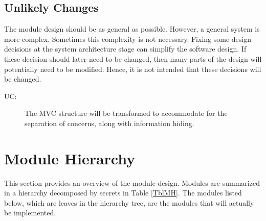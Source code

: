 \documentclass[12pt, titlepage]{article}
\newcounter{ucnum}
\newcommand{\uctheucnum}{UC\theucnum}
\begin{document}
\subsection{Unlikely Changes} \label{SecUchange}

The module design should be as general as possible. However, a general system is
more complex. Sometimes this complexity is not necessary. Fixing some design
decisions at the system architecture stage can simplify the software design. If
these decision should later need to be changed, then many parts of the design
will potentially need to be modified. Hence, it is not intended that these
decisions will be changed.

\begin{description}
\item[ \uctheucnum \label{ucIO}:] The MVC structure will be transformed to accommodate for the separation of concerns, along with information hiding.
\end{description}

\section{Module Hierarchy} \label{SecMH}

This section provides an overview of the module design. Modules are summarized
in a hierarchy decomposed by secrets in Table \ref{TblMH}. The modules listed
below, which are leaves in the hierarchy tree, are the modules that will
actually be implemented.
\end{document}
